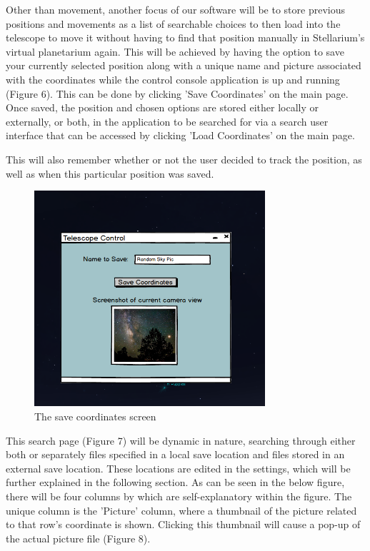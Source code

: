 \documentclass[12pt]{report}
\begin{document}
Other than movement, another focus of our software will be to store previous positions and movements as a list of searchable choices to then load into the telescope to move it without having to find that position manually in Stellarium's virtual planetarium again. This will be achieved by having the option to save your currently selected position along with a unique name and picture associated with the coordinates while the control console application is up and running (Figure 6). This can be done by clicking 'Save Coordinates' on the main page. Once saved, the position and chosen options are stored either locally or externally, or both, in the application to be searched for via a search user interface that can be accessed by clicking 'Load Coordinates' on the main page.

\newpage

This will also remember whether or not the user decided to track the position, as well as when this particular position was saved.


\begin{figure}[h]
	\centering
	\includegraphics[width=0.60\linewidth, height=8cm]{Save}
	\caption{The save coordinates screen}
\end{figure}

This search page (Figure 7) will be dynamic in nature, searching through either both or separately files specified in a local save location and files stored in an external save location. These locations are edited in the settings, which will be further explained in the following section. As can be seen in the below figure, there will be four columns by which are self-explanatory within the figure. The unique column is the 'Picture' column, where a thumbnail of the picture related to that row's coordinate is shown. Clicking this thumbnail will cause a pop-up of the actual picture file (Figure 8). 
\end{document}
